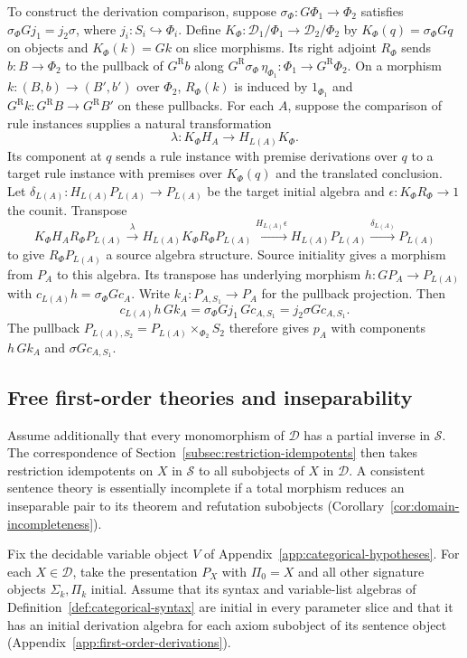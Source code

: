 To construct the derivation comparison, suppose
$\sigma_{\Phi}:G\Phi_1\to\Phi_2$ satisfies
$\sigma_\Phi G j_1=j_2\sigma$, where $j_i:S_i\hookrightarrow\Phi_i$.
Define $K_\Phi:\mathcal D_1/\Phi_1\to\mathcal D_2/\Phi_2$ by
$K_{\Phi}(q)=\sigma_{\Phi}Gq$ on objects and $K_\Phi(k)=Gk$ on
slice morphisms. Its right adjoint $R_\Phi$ sends $b:B\to\Phi_2$
to the pullback of $G^{\mathrm R}b$ along
$G^{\mathrm R}\sigma_{\Phi}\,\eta_{\Phi_1}:\Phi_1\to G^{\mathrm R}\Phi_2$.
On a morphism $k:(B,b)\to(B',b')$ over $\Phi_2$, $R_\Phi(k)$
is induced by $1_{\Phi_1}$ and $G^{\mathrm R}k:G^{\mathrm R}B\to G^{\mathrm R}B'$ on these pullbacks.
For each $A$, suppose the comparison of rule instances supplies a
natural transformation
\[
 \lambda:K_{\Phi}H_A\to H_{L(A)}K_{\Phi}.
\]
Its component at $q$ sends a rule instance with premise derivations
over $q$ to a target rule instance with premises over $K_\Phi(q)$
and the translated conclusion. Let
$\delta_{L(A)}:H_{L(A)}P_{L(A)}\to P_{L(A)}$ be the target initial algebra and
$\epsilon:K_{\Phi}R_{\Phi}\to1$ the counit. Transpose
\[
 K_{\Phi}H_AR_{\Phi}P_{L(A)}
 \xrightarrow{\lambda}H_{L(A)}K_{\Phi}R_{\Phi}P_{L(A)}
 \xrightarrow{H_{L(A)}\epsilon}H_{L(A)}P_{L(A)}
 \xrightarrow{\delta_{L(A)}}P_{L(A)}
\]
to give $R_{\Phi}P_{L(A)}$ a source algebra structure. Source initiality
gives a morphism from $P_A$ to this algebra. Its transpose has
underlying morphism $h:GP_A\to P_{L(A)}$ with
$c_{L(A)}h=\sigma_\Phi Gc_A$. Write $k_A:P_{A,S_1}\to P_A$ for the
pullback projection. Then
\[
 c_{L(A)}h\,Gk_A=\sigma_\Phi G j_1\,Gc_{A,S_1}
                 =j_2\sigma Gc_{A,S_1}.
\]
The pullback $P_{L(A),S_2}=P_{L(A)}\times_{\Phi_2} S_2$ therefore gives
$p_A$ with components $h\,Gk_A$ and $\sigma Gc_{A,S_1}$.

\subsection{Free first-order theories and inseparability}
\label{sec:free-first-order-theories}

Assume additionally that every monomorphism of $\mathcal D$ has a
partial inverse in $\mathscr S$. The correspondence of
Section~\ref{subsec:restriction-idempotents} then takes restriction
idempotents on $X$ in $\mathscr S$ to all subobjects of $X$ in
$\mathcal D$. A consistent sentence theory is essentially incomplete if a total morphism
reduces an inseparable pair to its theorem and refutation subobjects
(Corollary~\ref{cor:domain-incompleteness}).

Fix the decidable variable object $V$ of
Appendix~\ref{app:categorical-hypotheses}. For each $X\in\mathcal D$,
take the presentation $P_X$ with $\Pi_0=X$ and all other signature
objects $\Sigma_k,\Pi_k$ initial. Assume that its syntax and
variable-list algebras of Definition~\ref{def:categorical-syntax}
are initial in every parameter slice and that it has an initial
derivation algebra for each axiom subobject of its sentence object
(Appendix~\ref{app:first-order-derivations}).

